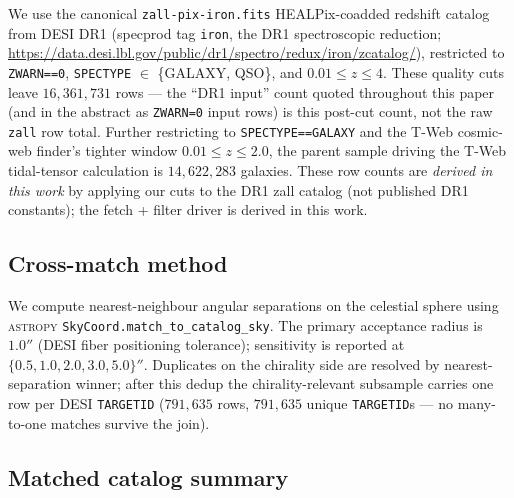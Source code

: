 \documentclass[aps,prd,twocolumn,superscriptaddress,showpacs,preprintnumbers,nofootinbib,longbibliography,floatfix]{revtex4-2}
\begin{document}
We use the canonical \texttt{zall-pix-iron.fits} HEALPix-coadded
redshift catalog from DESI DR1 (specprod tag \texttt{iron}, the DR1
spectroscopic reduction;
\url{https://data.desi.lbl.gov/public/dr1/spectro/redux/iron/zcatalog/}),
restricted to \texttt{ZWARN==0},
\texttt{SPECTYPE} $\in$ \{GALAXY, QSO\}, and $0.01 \le z \le 4$.
These quality cuts leave $16{,}361{,}731$ rows — the ``DR1 input''
count quoted throughout this paper (and in the abstract as
\texttt{ZWARN=0} input rows) is this post-cut count, not the raw
\texttt{zall} row total. Further restricting to
\texttt{SPECTYPE==GALAXY} and the T-Web cosmic-web finder's tighter
window $0.01 \le z \le 2.0$, the parent sample driving the T-Web
tidal-tensor calculation is $14{,}622{,}283$ galaxies. These row counts are
\emph{derived in this work} by applying our cuts to the DR1 zall
catalog (not published DR1 constants); the fetch + filter driver
is derived in this work.

\subsection{Cross-match method}

We compute nearest-neighbour angular separations on the celestial sphere
using \textsc{astropy} \texttt{SkyCoord.match\_to\_catalog\_sky}. The
primary acceptance radius is $1.0''$ (DESI fiber positioning tolerance);
sensitivity is reported at $\{0.5, 1.0, 2.0, 3.0, 5.0\}''$. Duplicates
on the chirality side are resolved by nearest-separation winner; after
this dedup the chirality-relevant subsample carries one row per DESI
\texttt{TARGETID} ($791{,}635$ rows, $791{,}635$ unique
\texttt{TARGETID}s — no many-to-one matches survive the join).

\subsection{Matched catalog summary}\label{sec:matched_summary}
\end{document}

